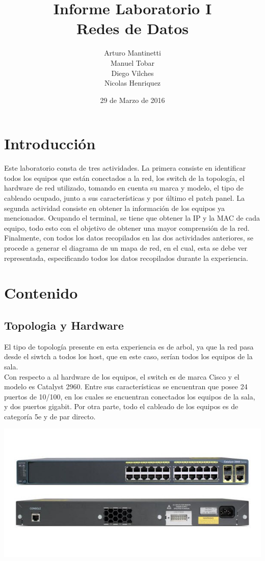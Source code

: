 \documentclass[spanish]{udpreport}
\title{Informe Laboratorio I \\ Redes de Datos}
\author{Arturo Mantinetti \\ Manuel Tobar \\ Diego Vilches \\ Nicolas Henriquez}
\date{29 de Marzo de 2016}
\begin{document}
\maketitle

\tableofcontents

\chapter{Introducción}

Este laboratorio consta de tres actividades. La primera consiste en identificar todos los equipos que están conectados a la red, los switch de la topología, el hardware de red utilizado, tomando en cuenta su marca y modelo, el tipo de cableado ocupado, junto a sus características y por último el patch panel. La segunda actividad consiste en obtener la información de los equipos ya mencionados. Ocupando el terminal, se tiene que obtener la IP y la MAC de cada equipo, todo esto con el objetivo de obtener una mayor comprensión de la red. Finalmente, con todos los datos recopilados en las dos actividades anteriores, se procede a generar el diagrama de un mapa de red, en el cual, esta se debe ver representada,  especificando todos los datos recopilados durante la experiencia.


\chapter{Contenido}

\section{Topologia y Hardware}
El tipo de topología presente en esta experiencia es de arbol, ya que la red pasa desde el siwtch a todos los host, que en este caso, serían todos los equipos de la sala.
\\
 
\setlength{\parindent}{0.5cm} Con respecto a al hardware de los equipos, el switch es de marca Cisco y el modelo es Catalyst 2960. Entre sus características se encuentran que posee 24 puertos de 10/100, en los cuales se encuentran conectados los equipos de la sala, y dos puertos gigabit. Por otra parte, todo el cableado de los equipos es de categoría 5e y de par directo.
\begin{center}
	\includegraphics[scale=.37]{images/switch.png}
\end{center}
  
\end{document}
